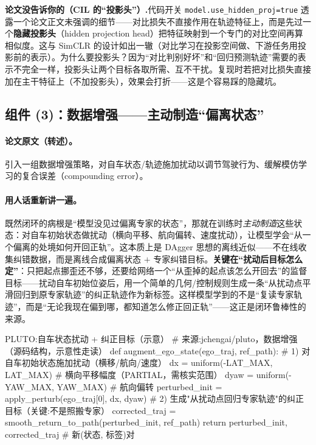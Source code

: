 \begin{note}
\textbf{论文没告诉你的（CIL 的“投影头”）.}\;代码开关 \texttt{model.\allowbreak use\_hidden\_proj=true} 透露一个论文正文未强调的细节——对比损失不直接作用在轨迹特征上，而是先过一个\textbf{隐藏投影头}（hidden projection head）把特征映射到一个专门的对比空间再算相似度。这与 SimCLR 的设计如出一辙（对比学习在投影空间做、下游任务用投影前的表示）。为什么要投影头？因为“对比判别好坏”和“回归预测轨迹”需要的表示不完全一样，投影头让两个目标各取所需、互不干扰。复现时若把对比损失直接加在主干特征上（不加投影头），效果会打折——这是个容易踩的隐藏坑。
\end{note}

\subsection{组件 (3)：数据增强——主动制造“偏离状态”}
\label{sec:de-augment}

\paragraph{论文原文（转述）。}
引入一组数据增强策略，对自车状态/轨迹施加扰动以调节驾驶行为、缓解模仿学习的复合误差（compounding error）\cite{cheng2024pluto}。

\paragraph{用人话重新讲一遍。}
既然闭环的病根是“模型没见过偏离专家的状态”，那就在训练时\emph{主动制造}这些状态：对自车初始状态做扰动（横向平移、航向偏转、速度扰动），让模型学会“从一个偏离的处境如何开回正轨”。这本质上是 DAgger\cite{ross2011dagger} 思想的离线近似——不在线收集纠错数据，而是离线合成偏离状态 $+$ 专家纠错目标。\textbf{关键在“扰动后目标怎么定”}：只把起点挪歪还不够，还要给网络一个“从歪掉的起点该怎么开回去”的监督目标——扰动自车初始位姿后，用一个简单的几何/控制规则生成一条“从扰动点平滑回归到原专家轨迹”的纠正轨迹作为新标签。这样模型学到的不是“复读专家轨迹”，而是“无论我现在偏到哪，都知道怎么修正回正轨”——这正是闭环鲁棒性的来源。

\begin{codebox}[Python]{PLUTO:自车状态扰动 + 纠正目标（示意）}
# 来源:jchengai/pluto，数据增强（源码结构，示意性走读）
def augment_ego_state(ego_traj, ref_path):
    # 1) 对自车初始状态施加扰动（横移/航向/速度）
    dx = uniform(-LAT_MAX, LAT_MAX)        # 横向平移幅度（PARTIAL，需核实范围）
    dyaw = uniform(-YAW_MAX, YAW_MAX)      # 航向偏转
    perturbed_init = apply_perturb(ego_traj[0], dx, dyaw)
    # 2) 生成"从扰动点回归专家轨迹"的纠正目标（关键:不是照搬专家）
    corrected_traj = smooth_return_to_path(perturbed_init, ref_path)
    return perturbed_init, corrected_traj  # 新(状态, 标签)对
\end{codebox}

